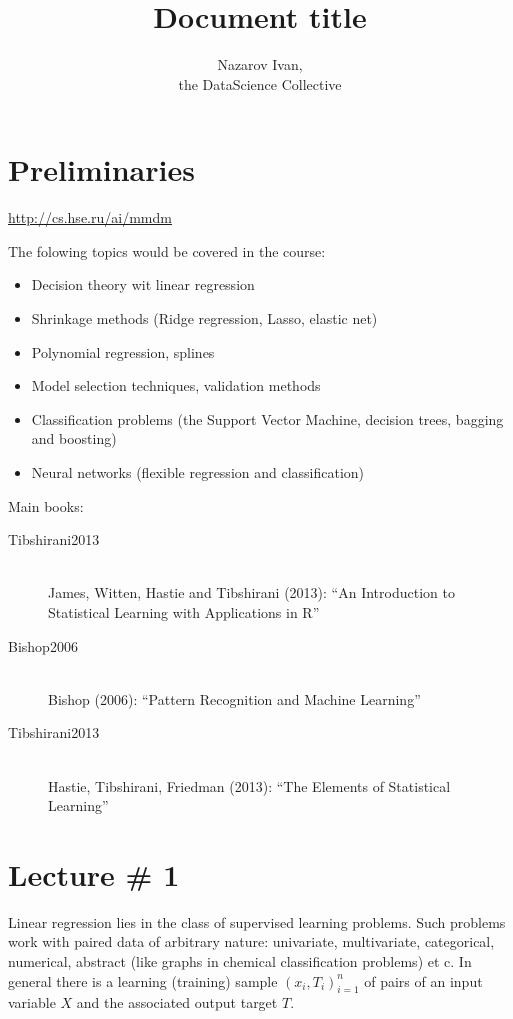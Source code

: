 \documentclass[a4paper]{article}
\title{Document title}
\author{Nazarov Ivan, \rus{101мНОД(ИССА)}\\the DataScience Collective}
\begin{document}
\maketitle

\section*{Preliminaries} %
\label{sec:preliminaries}

\url{http://cs.hse.ru/ai/mmdm}

The folowing topics would be covered in the course:
\begin{itemize}
	\item Decision theory wit linear regression
	\item Shrinkage methods (Ridge regression, Lasso, elastic net)
	\item Polynomial regression, splines
	\item Model selection techniques, validation methods
	\item Classification problems (the Support Vector Machine, decision trees,
	bagging and boosting)
	\item Neural networks (flexible regression and classification)
\end{itemize}

Main books:
\begin{description}
	\item[Tibshirani2013] \hfill\\
		James, Witten, Hastie and Tibshirani (2013): ``An Introduction to Statistical Learning with Applications in R''
	\item[Bishop2006] \hfill\\
		Bishop (2006): ``Pattern Recognition and Machine Learning''
	\item[Tibshirani2013] \hfill\\
		Hastie, Tibshirani, Friedman (2013): ``The Elements of Statistical Learning''
\end{description}


\clearpage
\section{Lecture \# 1} %
\label{sec:lecture_1}

Linear regression lies in the class of supervised learning problems.
Such problems work with paired data of arbitrary nature: univariate, multivariate,
categorical, numerical, abstract (like graphs in chemical classification problems) et c.
In general there is a learning (training) sample $(x_i, T_i)_{i=1}^n$ of pairs
of an input variable $X$ and the associated output target $T$.
\end{document}
